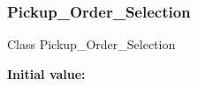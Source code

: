 \subsubsection{\texorpdfstring{Pickup\_Order\_Selection}{Pickup\_Order\_Selection}}
{\footnotesize\ttfamily Class Pickup\+\_\+\+Order\+\_\+\+Selection}

{\bfseries Initial value\+:}
\begin{DoxyCode}{0}
\DoxyCodeLine{\{}

\end{DoxyCode}
